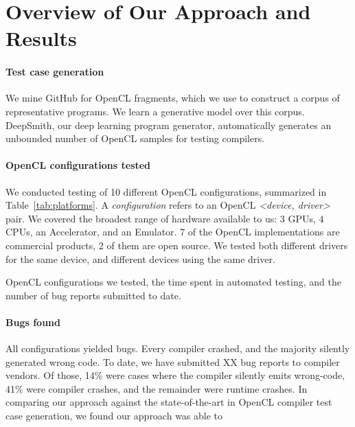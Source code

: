 \section{Overview of Our Approach and Results}\label{sec:overview}

\paragraph{Test case generation} We mine GitHub for OpenCL fragments, which we use to construct a corpus of representative programs. We learn a generative model over this corpus. DeepSmith, our deep learning program generator, automatically generates an unbounded number of OpenCL samples for testing compilers.

\paragraph{OpenCL configurations tested} We conducted testing of 10 different OpenCL configurations, summarized in Table~\ref{tab:platforms}. A \emph{configuration} refers to an OpenCL \emph{<device, driver>} pair. We covered the broadest range of hardware available to us: 3 GPUs, 4 CPUs, an Accelerator, and an Emulator. 7 of the OpenCL implementations are commercial products, 2 of them are open source. We tested both different drivers for the same device, and different devices using the same driver.


\begin{table*}[t!]
	\scriptsize %
	\centering %
	
	\caption{OpenCL configurations we tested, the time spent in automated testing, and the number of bug reports submitted to date.}
	\label{tab:platforms}
\end{table*}


\paragraph{Bugs found} All configurations yielded bugs. Every compiler crashed, and the majority silently generated wrong code. To date, we have submitted XX bug reports to compiler vendors. Of those, 14\% were cases where the compiler silently emits wrong-code, 41\% were compiler crashes, and the remainder were runtime crashes. In comparing our approach against the state-of-the-art in OpenCL compiler test case generation, we found our approach was able to \cc{\ldots}